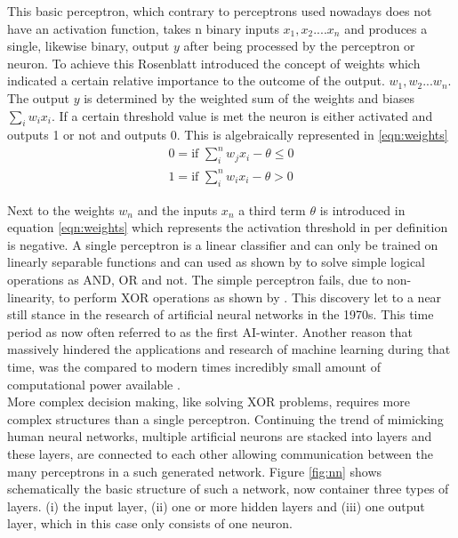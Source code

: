 This basic perceptron, which contrary to perceptrons used nowadays does not have an activation function, takes
n binary inputs $x_1 , x_2 .... x_n$ and produces a single, likewise binary, output $y$ after being processed
by the perceptron or neuron.  To achieve this Rosenblatt introduced the concept of weights which indicated a
certain relative importance to the outcome of the output. $w_1 , w_2 ... w_n$. The output $y$ is determined by
the weighted sum of the weights and biases $\sum_i w_ix_i $. If a certain threshold value is met the neuron is
either activated and outputs 1 or not and outputs 0. This is algebraically represented in \ref{eqn:weights}
\begin{subequations}
 \begin{align}
 0 = \mbox{if } \sum_i^n w_j x_i - \theta \leq 0 \\
 1 = \mbox{if } \sum_i^n w_i x_i - \theta > 0
 \end{align}
 \label{eqn:weights}
\end{subequations}

Next to the weights $w_n$ and the inputs $x_n$ a third term $\theta$ is introduced in equation
\ref{eqn:weights} which represents the activation threshold in per definition is negative. A single perceptron
is a linear classifier and can only be trained on linearly separable functions and can used as shown by
\cite{rosenblatt1961} to solve simple logical operations as AND, OR and not.  The simple perceptron fails, due
to non-linearity, to perform XOR operations as shown by \cite{marvin1969}. This discovery let to a near still
stance in the research of artificial neural networks in the 1970s. This time period as now often referred to
as the first AI-winter. Another reason that massively hindered the applications and research of machine
learning during that time, was the compared to
modern times incredibly small amount of computational power available \cite{nguyen1990truck}. \\
More complex decision making, like solving XOR problems, requires more complex structures than a single
perceptron. Continuing the trend of mimicking human neural networks, multiple artificial neurons are stacked
into layers and these layers, are connected to each other allowing communication between the many perceptrons
in a such generated network. Figure \ref{fig:nn} shows schematically the basic structure of such a network,
now container three types of layers. (i) the input layer, (ii) one or more hidden layers and (iii) one output
layer, which in this case only consists of one neuron.

